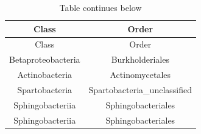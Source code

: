 \documentclass[]{article}
\begin{document}
\begin{longtable}[]{@{}cc@{}}
\caption{Table continues below}\tabularnewline
\toprule
\begin{minipage}[b]{0.29\columnwidth}\centering\strut
Class\strut
\end{minipage} & \begin{minipage}[b]{0.38\columnwidth}\centering\strut
Order\strut
\end{minipage}\tabularnewline
\midrule
\endfirsthead
\toprule
\begin{minipage}[b]{0.29\columnwidth}\centering\strut
Class\strut
\end{minipage} & \begin{minipage}[b]{0.38\columnwidth}\centering\strut
Order\strut
\end{minipage}\tabularnewline
\midrule
\endhead
\begin{minipage}[t]{0.29\columnwidth}\centering\strut
Betaproteobacteria\strut
\end{minipage} & \begin{minipage}[t]{0.38\columnwidth}\centering\strut
Burkholderiales\strut
\end{minipage}\tabularnewline
\begin{minipage}[t]{0.29\columnwidth}\centering\strut
Actinobacteria\strut
\end{minipage} & \begin{minipage}[t]{0.38\columnwidth}\centering\strut
Actinomycetales\strut
\end{minipage}\tabularnewline
\begin{minipage}[t]{0.29\columnwidth}\centering\strut
Spartobacteria\strut
\end{minipage} & \begin{minipage}[t]{0.38\columnwidth}\centering\strut
Spartobacteria\_unclassified\strut
\end{minipage}\tabularnewline
\begin{minipage}[t]{0.29\columnwidth}\centering\strut
Sphingobacteriia\strut
\end{minipage} & \begin{minipage}[t]{0.38\columnwidth}\centering\strut
Sphingobacteriales\strut
\end{minipage}\tabularnewline
\begin{minipage}[t]{0.29\columnwidth}\centering\strut
Sphingobacteriia\strut
\end{minipage} & \begin{minipage}[t]{0.38\columnwidth}\centering\strut
Sphingobacteriales\strut

\end{minipage}
\end{longtable}
\end{document}

